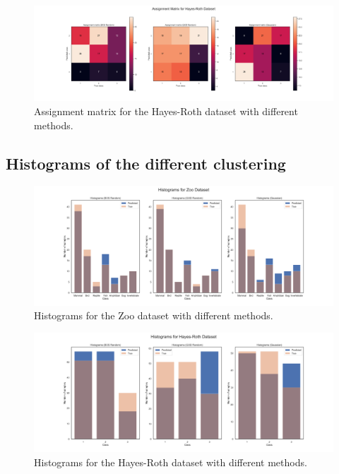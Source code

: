 \begin{figure}[H]
    \centering
    \includegraphics[width=\linewidth]{python_figures/assignment_matrix_hayes-roth.png}
    \caption{Assignment matrix for the Hayes-Roth dataset with different methods.}
    \label{fig:assign_hr}
\end{figure}

\subsection{Histograms of the different clustering}
\label{sec:appendix_hist}

\begin{figure}[H]
    \centering
    \includegraphics[width=\linewidth]{python_figures/histograms_zoo.png}
    \caption{Histograms for the Zoo dataset with different methods.}
    \label{fig:hist_zoo}
\end{figure}

\begin{figure}[H]
    \centering
    \includegraphics[width=\linewidth]{python_figures/histograms_hayes-roth.png}
    \caption{Histograms for the Hayes-Roth dataset with different methods.}
    \label{fig:hist_hr}
\end{figure}
